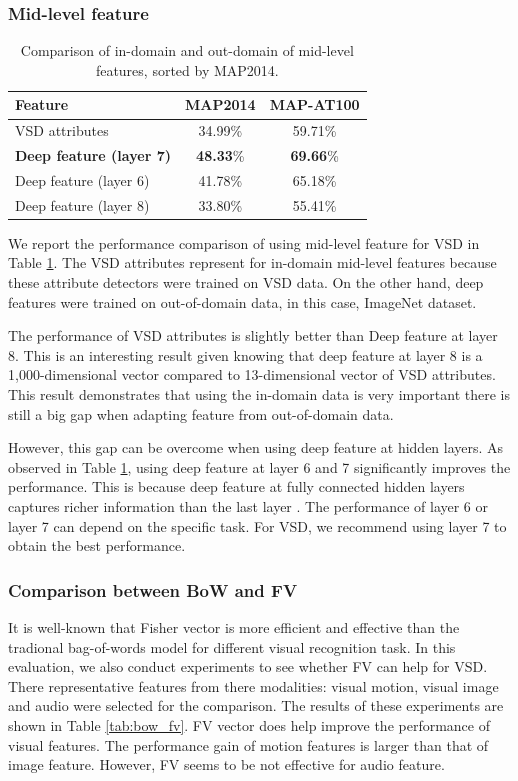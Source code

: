 \documentclass[twocolumn]{bmcart}%
\begin{document}
\subsubsection{Mid-level feature}
\begin{table}
	\centering
	\caption{Comparison of in-domain and out-domain of mid-level features, sorted by MAP2014.}
	\begin{tabular}{lcc}
		\hline
		Feature & MAP2014 & MAP-AT100 \\ \hline
		VSD	attributes & 34.99\% & 59.71\% \\ \hline
		\textbf{Deep feature (layer 7)} &\textbf{ 48.33}\% & \textbf{69.66}\% \\
		Deep feature (layer 6) & 41.78\% & 65.18\% \\
		Deep feature (layer 8) & 33.80\% & 55.41\% \\ \hline
	\end{tabular}%
	\label{tab:midlevel}%
\end{table}%
We report the performance comparison of using mid-level feature for VSD in Table \ref{tab:midlevel}. The VSD attributes represent for in-domain mid-level features because these attribute detectors were trained on VSD data. On the other hand, deep features were trained on out-of-domain data, in this case, ImageNet dataset.

The performance of VSD attributes is slightly better than Deep feature at layer 8. This is an interesting result given knowing that deep feature at layer 8 is a 1,000-dimensional vector compared to 13-dimensional vector of VSD attributes. This result demonstrates that using the in-domain data is very important there is still a big gap when adapting feature from out-of-domain data.

However, this gap can be overcome when using deep feature at hidden layers. As observed in Table \ref{tab:midlevel}, using deep feature at layer 6 and 7 significantly improves the performance. This is because deep feature at fully connected hidden layers captures richer information than the last layer \cite{donahue2013decaf}. The performance of layer 6 or layer 7 can depend on the specific task. For VSD, we recommend using layer 7 to obtain the best performance.

\subsubsection{Comparison between BoW and FV}
It is well-known that Fisher vector is more efficient and effective than the tradional bag-of-words model for different visual recognition task. In this evaluation, we also conduct experiments to see whether FV can help for VSD. There representative features from there modalities: visual motion, visual image and audio were selected for the comparison. The results of these experiments are shown in Table \ref{tab:bow_fv}. FV vector does help improve the performance of visual features. The performance gain of motion features is larger than that of image feature. However, FV seems to be not effective for audio feature.
\end{document}
